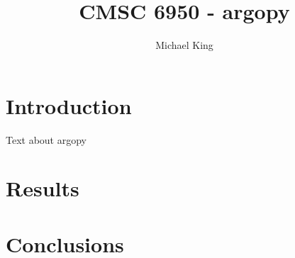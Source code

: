 \documentclass{article}
\title{CMSC 6950 - argopy}
\author{Michael King}
\begin{document}
\maketitle

\section{Introduction}

Text about argopy

\section{Results}

\section{Conclusions}
\end{document}
